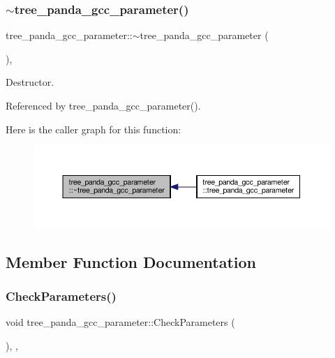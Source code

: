 \subsubsection{\texorpdfstring{$\sim$tree\+\_\+panda\+\_\+gcc\+\_\+parameter()}{~tree\_panda\_gcc\_parameter()}}
{\footnotesize\ttfamily tree\+\_\+panda\+\_\+gcc\+\_\+parameter\+::$\sim$tree\+\_\+panda\+\_\+gcc\+\_\+parameter (\begin{DoxyParamCaption}{ }\end{DoxyParamCaption})\hspace{0.3cm}{\ttfamily [override]}, {\ttfamily [default]}}



Destructor. 



Referenced by tree\+\_\+panda\+\_\+gcc\+\_\+parameter().

Here is the caller graph for this function\+:
\nopagebreak
\begin{figure}[H]
\begin{center}
\leavevmode
\includegraphics[width=350pt]{da/df6/classtree__panda__gcc__parameter_a66bc6cffdf5df44710b31ec65caf27c1_icgraph}
\end{center}
\end{figure}


\subsection{Member Function Documentation}
\mbox{\label{classtree__panda__gcc__parameter_a848c8dc5dc64dbd6344d3b0a99f3617b}} 
\subsubsection{\texorpdfstring{Check\+Parameters()}{CheckParameters()}}
{\footnotesize\ttfamily void tree\+\_\+panda\+\_\+gcc\+\_\+parameter\+::\+Check\+Parameters (\begin{DoxyParamCaption}{ }\end{DoxyParamCaption})\hspace{0.3cm}{\ttfamily [override]}, {\ttfamily [private]}, {\ttfamily [virtual]}}



